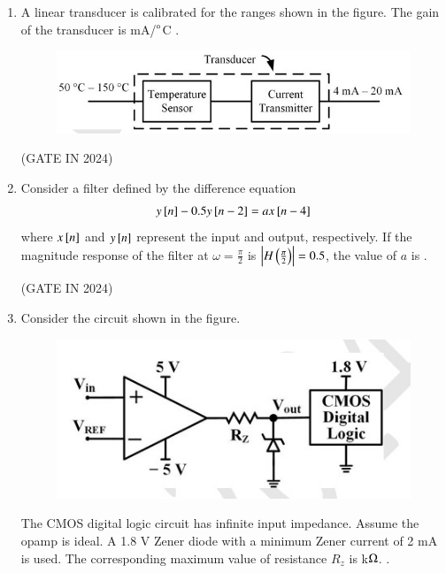\documentclass[journal,12pt,onecolumn]{IEEEtran}
\theoremstyle{remark}
\begin{document}
\begin{enumerate}
    \item A linear transducer is calibrated for the ranges shown in the figure.  The gain of the transducer is \underline{\hspace{2cm}} mA/$\degree$C .
    \begin{figure}[H]
        \centering
        \includegraphics[width=0.7\columnwidth]{figs/p10.jpg}
        \caption*{}
        \label{fig:p10}
    \end{figure}
    
    \hfill{(GATE IN 2024)}
    
    \item Consider a filter defined by the difference equation
    \begin{align*}
        y{}\left[n\right] - 0.5 y{}\left[n-2\right] = a x{}\left[n-4\right]
    \end{align*}
    where $x{}\left[n\right]$ and $y{}\left[n\right]$ represent the input and output, respectively. If the magnitude response of the filter at $\omega = \frac{\pi}{2}$ is $\left\vert H\left(\frac{\pi}{2}\right)\right\vert = 0.5$, the value of $a$ is \underline{\hspace{2cm}} .
    
    \hfill{(GATE IN 2024)}

    \item Consider the circuit shown in the figure.
    \begin{figure}[H]
        \centering
        \includegraphics[width=0.6\columnwidth]{figs/p11.jpg}
        \caption*{}
        \label{fig:p11}
    \end{figure}
    The CMOS digital logic circuit has infinite input impedance. Assume the opamp is ideal. A 1.8 V Zener diode with a minimum Zener current of 2 mA is used. The corresponding maximum value of resistance $R_z$ is \underline{\hspace{2cm}} k$\ohm$. .
    

\end{enumerate}
\end{document}
